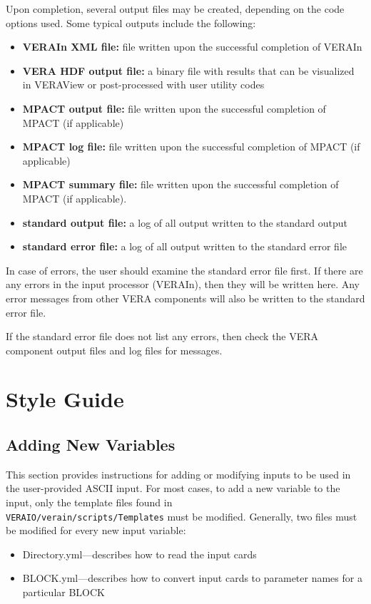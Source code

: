 \documentclass{vera-ornltm}
\begin{document}
Upon completion, several output files may be created, depending on the code options used.
Some typical outputs include the following:
\begin{itemize}
\item \textbf{VERAIn XML file:}  file written upon the successful completion of VERAIn
\item \textbf{VERA HDF output file:}  a binary file with results that can be visualized in VERAView or post-processed with user utility codes
\item \textbf{MPACT output file:} file written upon the successful completion of MPACT (if applicable)
\item \textbf{MPACT log file:} file written upon the successful completion of MPACT (if applicable)
\item \textbf{MPACT summary file:} file written upon the successful completion of MPACT (if applicable).
\item \textbf{standard output file:} a log of all output written to the standard output
\item \textbf{standard error file:} a log of all output written to the standard error file
\end{itemize}


In case of errors, the user should examine the standard error file first.
If there are any errors in the input processor (VERAIn), then they will be written here.
Any error messages from other VERA components will also be written to the standard error file.

If the standard error file does not list any errors, then check the VERA component output files and log files for messages.


\section{Style Guide}

\subsection{Adding New Variables}

This section provides instructions for adding or modifying inputs to be used in the user-provided ASCII input. For most cases, to add a new variable to the input, only the template files found in\\
\texttt{VERAIO/verain/scripts/Templates} must be modified. Generally, two files must be modified for every new input variable:
\begin{itemize}
    \item{Directory.yml}---describes how to read the input cards
    \item{BLOCK.yml}---describes how to convert input cards to parameter names for a particular BLOCK
\end{itemize}
\end{document}
